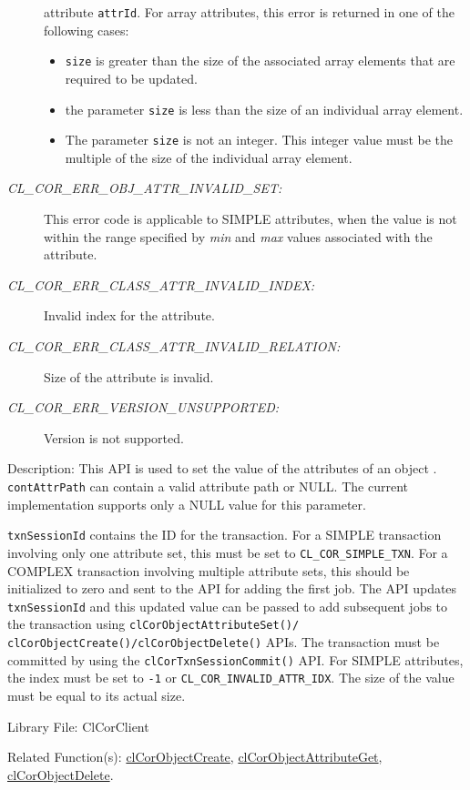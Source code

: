 \begin{flushleft}
\begin{Desc}
\begin{description}
attribute {\tt{attrId}}. For array attributes, this error is returned in one of the following cases:
\begin{itemize}
\item {\tt{size}} is greater than the size of the associated array elements that are required to be updated.
\item the parameter {\tt{size}} is less than the size of an individual array element.
\item The parameter {\tt{size}} is not an integer. This integer value must be the multiple of the size of the individual array element.
\end{itemize}
\item[{\em CL\_\-COR\_\-ERR\_\-OBJ\_\-ATTR\_\-INVALID\_\-SET:}]This error code is applicable to SIMPLE attributes, when the value is not within
the range specified by {\em min\/} and {\em max\/} values associated with the attribute.
\item[{\em CL\_\-COR\_\-ERR\_\-CLASS\_\-ATTR\_\-INVALID\_\-INDEX:}] Invalid index for the attribute.
\item[{\em CL\_\-COR\_\-ERR\_\-CLASS\_\-ATTR\_\-INVALID\_\-RELATION:}]Size of the attribute is invalid. 
\item[{\em CL\_\-COR\_\-ERR\_\-VERSION\_\-UNSUPPORTED:}] Version is not supported.\end{description}
\end{Desc}
\begin{Desc}
\item[Description:]This API is used to set the value of the attributes of an object . {\tt{contAttrPath}} can contain a valid attribute path or NULL. 
The current implementation supports only a NULL value for this parameter. 
\par
{\tt{txnSessionId}} contains the ID for the transaction. For a SIMPLE transaction involving only one attribute set, this must be set to 
{\tt{CL\_\-COR\_\-SIMPLE\_\-TXN}}. 
For a COMPLEX transaction involving multiple attribute sets, this should be initialized to zero and sent to the API for adding the first job. 
The API updates {\tt{txnSessionId}} and this updated value can be passed to add subsequent jobs to the transaction using 
{\tt{clCorObjectAttributeSet()/ clCorObjectCreate()/clCorObjectDelete()}} APIs. The transaction must be committed by using the {\tt{clCorTxnSessionCommit()}} API. For
SIMPLE attributes, the index must be set to {\tt{-1}} or {\tt{CL\_\-COR\_\-INVALID\_\-ATTR\_\-IDX}}. The size of the value must be equal to its actual 
size.
\end{Desc}
\begin{Desc}
\item[Library File:]Cl\-Cor\-Client\end{Desc}
\begin{Desc}
\item[Related Function(s):]\hyperlink{pagecor100}{cl\-Cor\-Object\-Create}, \hyperlink{pagecor127}{cl\-Cor\-Object\-Attribute\-Get},
\hyperlink{pagecor130}{cl\-Cor\-Object\-Delete}. \end{Desc}
\newpage



\end{flushleft}
